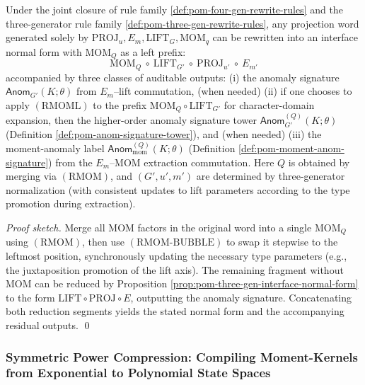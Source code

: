 \begin{proposition}\label{prop:pom-mom-interface-normal-form}
Under the joint closure of rule family \ref{def:pom-four-gen-rewrite-rules} and the three-generator rule family \ref{def:pom-three-gen-rewrite-rules},
any projection word generated solely by \(\mathrm{PROJ}_u,E_m,\mathrm{LIFT}_G,\mathrm{MOM}_q\) can be rewritten into an interface normal form with \(\mathrm{MOM}_Q\) as a left prefix:
$$
\boxed{\;
\mathrm{MOM}_Q\ \circ\ \mathrm{LIFT}_{G'}\ \circ\ \mathrm{PROJ}_{u'}\ \circ\ E_{m'}
\;}
$$
accompanied by three classes of auditable outputs:
(i) the anomaly signature \(\mathsf{Anom}_{G'}(K;\theta)\) from \(E_m\)--lift commutation,
(when needed)
(ii) if one chooses to apply \((\mathrm{RMOML})\) to the prefix \(\mathrm{MOM}_Q\circ \mathrm{LIFT}_{G'}\) for character-domain expansion, then the higher-order anomaly signature tower \(\mathsf{Anom}^{(Q)}_{G'}(K;\theta)\) (Definition \ref{def:pom-anom-signature-tower}),
and (when needed)
(iii) the moment-anomaly label \(\mathsf{Anom}^{(Q)}_{\mathrm{mom}}(K;\theta)\) (Definition \ref{def:pom-moment-anom-signature}) from the \(E_m\)--\(\mathrm{MOM}\) extraction commutation.
Here \(Q\) is obtained by merging via \((\mathrm{RMOM})\), and \((G',u',m')\) are determined by three-generator normalization (with consistent updates to lift parameters according to the type promotion during extraction).
\end{proposition}

\begin{proof}[Proof sketch]
Merge all \(\mathrm{MOM}\) factors in the original word into a single \(\mathrm{MOM}_Q\) using \((\mathrm{RMOM})\), then use \((\mathrm{RMOM\text{-}BUBBLE})\) to swap it stepwise to the leftmost position, synchronously updating the necessary type parameters (e.g., the juxtaposition promotion of the lift axis).
The remaining fragment without \(\mathrm{MOM}\) can be reduced by Proposition \ref{prop:pom-three-gen-interface-normal-form} to the form \(\mathrm{LIFT}\circ\mathrm{PROJ}\circ E\), outputting the anomaly signature.
Concatenating both reduction segments yields the stated normal form and the accompanying residual outputs. \qed
\end{proof}

\subsubsection{Symmetric Power Compression: Compiling Moment-Kernels from Exponential to Polynomial State Spaces}\label{subsec:pom-moment-symmetric-power}

